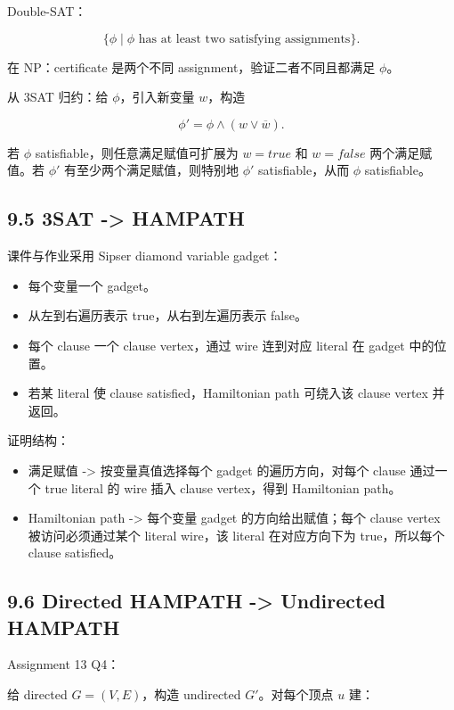 ﻿\documentclass[UTF8,11pt]{ctexart}
\begin{document}
Double-SAT：

\[
\{\phi\mid \phi\text{ has at least two satisfying assignments}\}.
\]


在 NP：certificate 是两个不同 assignment，验证二者不同且都满足 \(\phi\)。


从 3SAT 归约：给 \(\phi\)，引入新变量 \(w\)，构造

\[
\phi'=\phi\wedge(w\vee\overline w).
\]

若 \(\phi\) satisfiable，则任意满足赋值可扩展为 \(w=true\) 和 \(w=false\) 两个满足赋值。若 \(\phi'\) 有至少两个满足赋值，则特别地 \(\phi'\) satisfiable，从而 \(\phi\) satisfiable。


\subsection{9.5 3SAT -> HAMPATH}


课件与作业采用 Sipser diamond variable gadget：


\begin{itemize}
\item 每个变量一个 gadget。
\item 从左到右遍历表示 true，从右到左遍历表示 false。
\item 每个 clause 一个 clause vertex，通过 wire 连到对应 literal 在 gadget 中的位置。
\item 若某 literal 使 clause satisfied，Hamiltonian path 可绕入该 clause vertex 并返回。
\end{itemize}


证明结构：


\begin{itemize}
\item 满足赋值 -> 按变量真值选择每个 gadget 的遍历方向，对每个 clause 通过一个 true literal 的 wire 插入 clause vertex，得到 Hamiltonian path。
\item Hamiltonian path -> 每个变量 gadget 的方向给出赋值；每个 clause vertex 被访问必须通过某个 literal wire，该 literal 在对应方向下为 true，所以每个 clause satisfied。
\end{itemize}


\subsection{9.6 Directed HAMPATH -> Undirected HAMPATH}


Assignment 13 Q4：


给 directed \(G=(V,E)\)，构造 undirected \(G'\)。对每个顶点 \(u\) 建：
\end{document}
